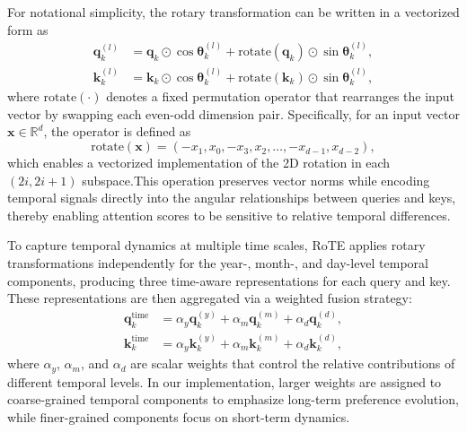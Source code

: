 \documentclass[sigconf,natbib=true]{acmart}
\begin{document}
For notational simplicity, the rotary transformation can be written in a vectorized form as
\begin{equation}
\begin{aligned}
\mathbf{q}_k^{(l)} &= \mathbf{q}_k \odot \cos \boldsymbol{\theta}_k^{(l)} 
+ \mathrm{rotate}(\mathbf{q}_k) \odot \sin \boldsymbol{\theta}_k^{(l)}, \\
\mathbf{k}_k^{(l)} &= \mathbf{k}_k \odot \cos \boldsymbol{\theta}_k^{(l)} 
+ \mathrm{rotate}(\mathbf{k}_k) \odot \sin \boldsymbol{\theta}_k^{(l)},
\end{aligned}
\end{equation}
where $\mathrm{rotate}(\cdot)$ denotes a fixed permutation operator that rearranges the input vector by swapping each even-odd dimension pair.
Specifically, for an input vector $\mathbf{x} \in \mathbb{R}^{d}$, the operator is defined as
\begin{equation}
\mathrm{rotate}(\mathbf{x}) = (-x_1, x_0, -x_3, x_2, \dots, -x_{d-1}, x_{d-2}),
\end{equation}
which enables a vectorized implementation of the 2D rotation in each $(2i, 2i+1)$ subspace.This operation preserves vector norms while encoding temporal signals directly into the angular relationships between queries and keys, thereby enabling attention scores to be sensitive to relative temporal differences.

To capture temporal dynamics at multiple time scales, RoTE applies rotary transformations independently for the year-, month-, and day-level temporal components, producing three time-aware representations for each query and key.
These representations are then aggregated via a weighted fusion strategy:
\begin{equation}
\begin{aligned}
\mathbf{q}_k^{\text{time}} &=
\alpha_y \mathbf{q}_k^{(y)} +
\alpha_m \mathbf{q}_k^{(m)} +
\alpha_d \mathbf{q}_k^{(d)}, \\
\mathbf{k}_k^{\text{time}} &=
\alpha_y \mathbf{k}_k^{(y)} +
\alpha_m \mathbf{k}_k^{(m)} +
\alpha_d \mathbf{k}_k^{(d)},
\end{aligned}
\end{equation}
where $\alpha_y$, $\alpha_m$, and $\alpha_d$ are scalar weights that control the relative contributions of different temporal levels.
In our implementation, larger weights are assigned to coarse-grained temporal components to emphasize long-term preference evolution, while finer-grained components focus on short-term dynamics.
\end{document}
